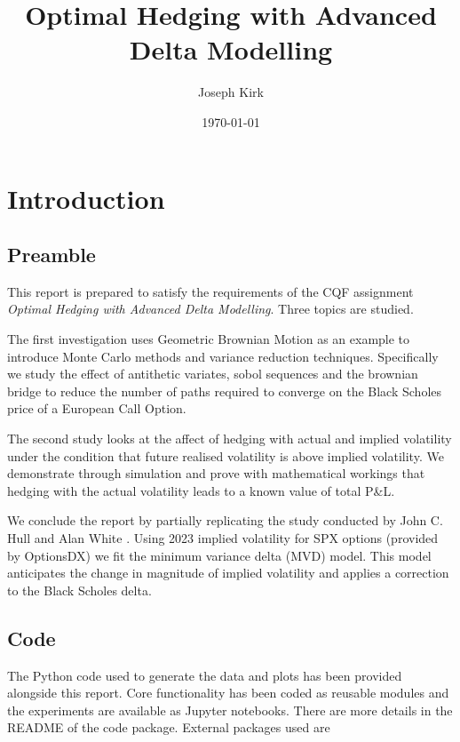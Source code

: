 \documentclass{article}
\newcommand{\para}{\vspace{8pt}} %
\begin{document}
\title{Optimal Hedging with Advanced Delta Modelling }
\author{Joseph Kirk}
\date{\today}

\maketitle

\newpage
\tableofcontents

\newpage
\section{Introduction}

\subsection{Preamble}
This report is prepared to satisfy the requirements of the CQF assignment \textit{Optimal Hedging with Advanced Delta Modelling}. Three topics are studied.

\para
The first investigation uses Geometric Brownian Motion as an example to introduce Monte Carlo methods and variance reduction techniques. 
Specifically we study the effect of antithetic variates, sobol sequences and the brownian bridge to reduce the number of paths required to converge on the Black Scholes 
price of a European Call Option.

\para
The second study looks at the affect of hedging with actual and implied volatility under the condition that future realised volatility is
above implied volatility.  We demonstrate through simulation and prove with mathematical workings that hedging with the actual volatility leads to a known value of total 
P\&L.  

\para
We conclude the report by partially replicating the study conducted by John C. Hull and Alan White \cite{hull}. Using 2023 implied volatility for SPX options (provided by OptionsDX)
we fit the minimum variance delta (MVD) model. This model anticipates the change in magnitude of implied volatility and applies a correction to the Black Scholes delta.

\subsection{Code}

The Python code used to generate the data and plots has been provided alongside this report. Core functionality has been coded as reusable modules and the experiments
are available as Jupyter notebooks. There are more details in the README of the code package.  External packages used are
\end{document}
